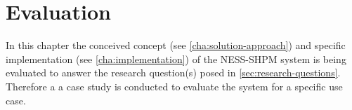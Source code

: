 \documentclass[11pt]{scrreprt}
\begin{document}
%
%




\chapter{Evaluation}
In this chapter the conceived concept (see \cref{cha:solution-approach}) and specific implementation (see \cref{cha:implementation}) of the NESS-SHPM system is being evaluated to answer the research question(s) posed in \cref{sec:research-questions}. Therefore a a case study is conducted to evaluate the system for a specific use case. 
\end{document}
